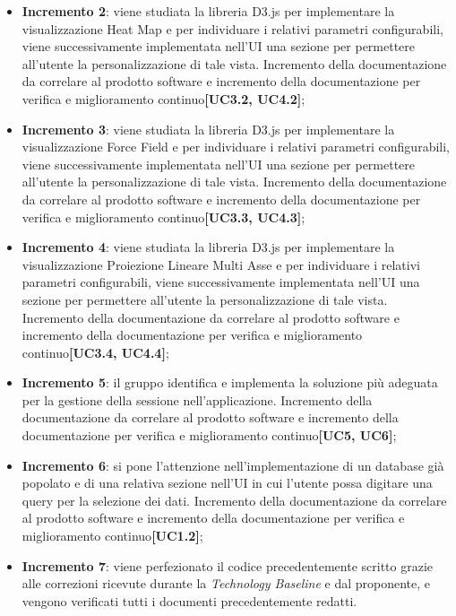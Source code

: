\begin{itemize}
\begin{itemize}
	\item \textbf{Incremento 2}: viene studiata la libreria D3.js per implementare la visualizzazione Heat Map e per individuare i relativi parametri configurabili, viene successivamente implementata nell'UI una sezione per permettere all'utente la personalizzazione di tale vista. Incremento della documentazione da correlare al prodotto software e incremento della documentazione per verifica e miglioramento continuo\textbf{[UC3.2, UC4.2]};
	
	\item \textbf{Incremento 3}: viene studiata la libreria D3.js per implementare la visualizzazione Force Field e per individuare i relativi parametri configurabili, viene successivamente implementata nell'UI una sezione per permettere all'utente la personalizzazione di tale vista. Incremento della documentazione da correlare al prodotto software e incremento della documentazione per verifica e miglioramento continuo\textbf{[UC3.3, UC4.3]};
	
	\item \textbf{Incremento 4}: viene studiata la libreria D3.js per implementare la visualizzazione Proiezione Lineare Multi Asse e per individuare i relativi parametri configurabili, viene successivamente implementata nell'UI una sezione per permettere all'utente la personalizzazione di tale vista. Incremento della documentazione da correlare al prodotto software e incremento della documentazione per verifica e miglioramento continuo\textbf{[UC3.4, UC4.4]};
	
	\item \textbf{Incremento 5}: il gruppo identifica e implementa la soluzione più adeguata per la gestione della sessione nell'applicazione. Incremento della documentazione da correlare al prodotto software e incremento della documentazione per verifica e miglioramento continuo\textbf{[UC5, UC6]};
	
	\item \textbf{Incremento 6}: si pone l'attenzione nell'implementazione di un database già popolato e di una relativa sezione nell'UI in cui l'utente possa digitare una query per la selezione dei dati. Incremento della documentazione da correlare al prodotto software e incremento della documentazione per verifica e miglioramento continuo\textbf{[UC1.2]};
	
	\item \textbf{Incremento 7}: viene perfezionato il codice precedentemente scritto grazie alle correzioni ricevute durante la \textit{Technology Baseline} e dal proponente, e vengono verificati tutti i documenti precedentemente redatti.
	\end{itemize}
\end{itemize}

